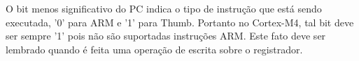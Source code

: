 \begin{description}
O bit menos significativo do PC indica o tipo de instrução que está sendo executada, '0' para ARM e '1' para Thumb. Portanto no Cortex-M4, tal bit deve ser sempre '1' pois não são suportadas instruções ARM. Este fato deve ser lembrado quando é feita uma operação de escrita sobre o registrador.

\end{description}



